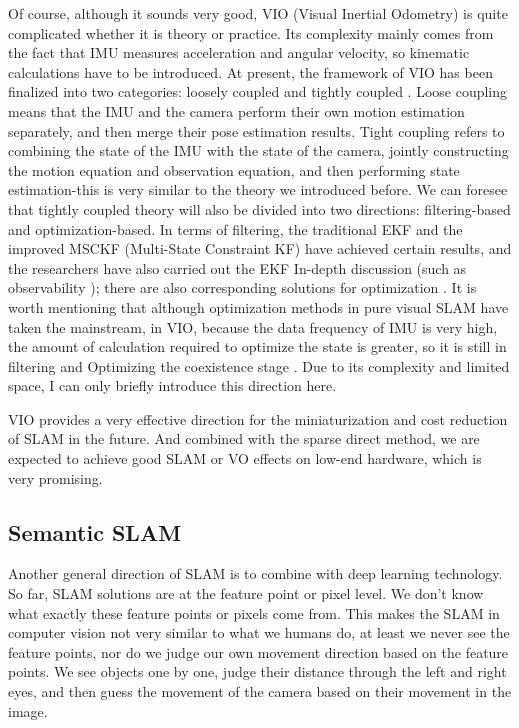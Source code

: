 Of course, although it sounds very good, VIO (Visual Inertial Odometry) is quite complicated whether it is theory or practice. Its complexity mainly comes from the fact that IMU measures acceleration and angular velocity, so kinematic calculations have to be introduced. At present, the framework of VIO has been finalized into two categories: loosely coupled and tightly coupled {\cite{Martinelli2014}}. Loose coupling means that the IMU and the camera perform their own motion estimation separately, and then merge their pose estimation results. Tight coupling refers to combining the state of the IMU with the state of the camera, jointly constructing the motion equation and observation equation, and then performing state estimation-this is very similar to the theory we introduced before. We can foresee that tightly coupled theory will also be divided into two directions: filtering-based and optimization-based. In terms of filtering, the traditional EKF {\cite{Bloesch2015}} and the improved MSCKF (Multi-State Constraint KF) {\cite{Li2013}} have achieved certain results, and the researchers have also carried out the EKF In-depth discussion (such as observability {\cite{Huang2014}}); there are also corresponding solutions for optimization {\cite{Leutenegger2015, Forster2015}}. It is worth mentioning that although optimization methods in pure visual SLAM have taken the mainstream, in VIO, because the data frequency of IMU is very high, the amount of calculation required to optimize the state is greater, so it is still in filtering and Optimizing the coexistence stage {\cite{Tkocz2015, Usenko2016}}. Due to its complexity and limited space, I can only briefly introduce this direction here.

VIO provides a very effective direction for the miniaturization and cost reduction of SLAM in the future. And combined with the sparse direct method, we are expected to achieve good SLAM or VO effects on low-end hardware, which is very promising.

\subsection{Semantic SLAM}
Another general direction of SLAM is to combine with deep learning technology. So far, SLAM solutions are at the feature point or pixel level. We don't know what exactly these feature points or pixels come from. This makes the SLAM in computer vision not very similar to what we humans do, at least we never see the feature points, nor do we judge our own movement direction based on the feature points. We see objects one by one, judge their distance through the left and right eyes, and then guess the movement of the camera based on their movement in the image.

